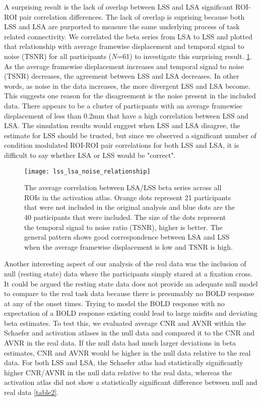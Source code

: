\documentclass[10pt,letterpaper]{article}
\begin{document}
A surprising result is the lack of overlap between LSS and LSA significant ROI-ROI pair correlation differences.
The lack of overlap is suprising because both LSS and LSA are purported to
measure the same underlying process of task related connectivity.
We correlated the beta series from LSA to LSS and plotted that relationship with
average framewise displacement and temporal signal to noise (TSNR) for all participants ($N$=61) to investigate this surprising result. \ref{fig:lss_lsa_correlation}.
As the average framewise displacement increases and temporal signal to noise (TSNR)
decreases, the agreement between LSS and LSA decreases.
In other words, as noise in the data increases, the more divergent LSS and LSA become.
This suggests one reason for the disagreement is the noise present in the included
data.
There appears to be a cluster of particpants with an average framewise displacement of
less than 0.2mm that have a high correlation between LSS and LSA.
The simulation results would suggest when LSS and LSA disagree, the estimate for LSS should be
trusted, but since we observed a significant number of condition modulated ROI-ROI pair correlations for both
LSS and LSA, it is difficult to say whether LSA or LSS would be "correct".

\begin{figure}[H]
  \centering
  \texttt{[image: lss\_lsa\_noise\_relationship]}
  \caption{
    The average correlation between LSA/LSS beta series across
    all ROIs in the activation atlas.
    Orange dots represent 21 participants that were not included
    in the original analysis and blue dots are the 40
    participants that were included.
    The size of the dots represent the temporal signal to noise
    ratio (TSNR), higher is better.
    The general pattern shows good correspondence between LSA and LSS
    when the average framewise displacement is low and TSNR is high.
  }
  \label{fig:lss_lsa_correlation}
\end{figure}

Another interesting aspect of our analysis of the real data was the inclusion of
null (resting state) data where the participants simply stared at a fixation cross.
It could be argued the resting state data does not provide an adequate null model
to compare to the real task data because there is presumably no BOLD response at any
of the onset times.
Trying to model the BOLD response with no expectation of a BOLD response existing could lead
to large misfits and deviating beta estimates.
To test this, we evaluated average CNR and AVNR within the Schaefer and activation atlases in
the null data and compared it to the CNR and AVNR in the real data.
If the null data had much larger deviations in beta estimates, CNR and AVNR would be higher
in the null data relative to the real data.
For both LSS and LSA, the Schaefer atlas had statistically significantly higher
CNR/AVNR in the null data relative to the real data, whereas the activation atlas
did not show a statistically significant difference between null and real data \ref{table2}.
\end{document}
